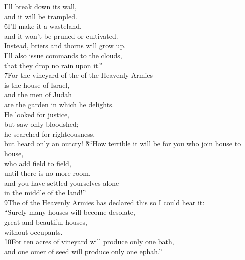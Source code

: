 \begin{poetry}
\poeml I'll break down its wall, \\
\poemll    and it will be trampled. \\
\poeml \v{6}I'll make it a wasteland, \\
\poemll    and it won't be pruned or cultivated. \\
\poeml Instead, briers and thorns will grow up. \\
\poemll    I'll also issue commands to the clouds, \\
\poemlll       that they drop no rain upon it.'' \\
\poeml \v{7}For the vineyard of the  of the Heavenly Armies \\
\poemll    is the house of Israel, \\
\poeml and the men of Judah \\
\poemll    are the garden in which he delights. \\
\poeml He looked for justice, \\
\poemll    but saw only bloodshed; \\
\poeml he searched for righteousness, \\
\poemll    but heard only an outcry!
\poeml \v{8}``How terrible it will be for you who join house to house, \\
\poemll    who add field to field, \\
\poeml until there is no more room, \\
\poemll    and you have settled yourselves alone \\
\poemlll       in the middle of the land!'' \\
\poeml \v{9}The  of the Heavenly Armies has declared this so I could hear it: \\
\poeml ``Surely many houses will become desolate, \\
\poemll    great and beautiful houses, \\
\poemlll       without occupants. \\
\poeml \v{10}For ten acres of vineyard will produce only one bath, \\
\poemll    and one omer of seed will produce only one ephah.''

\end{poetry}
